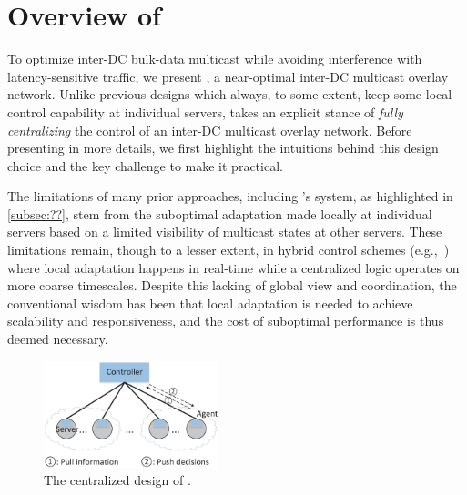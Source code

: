 \section{Overview of \name}
\label{sec:overview}

To optimize inter-DC bulk-data multicast while avoiding
interference with latency-sensitive traffic, we present \name,
a near-optimal inter-DC multicast overlay network.
Unlike previous designs which always, to some extent, keep
some local control capability at individual servers,
\name takes an explicit stance of {\em fully centralizing} the
control of an inter-DC multicast overlay network.
Before presenting \name in more details,
we first highlight the intuitions behind this design
choice and the key challenge to make it practical.







The limitations of many prior approaches, including \company's
system, as highlighted in \Section\ref{subsec:??},
stem from the suboptimal adaptation made locally
at individual servers
based on a limited visibility of multicast states at
other servers.
These limitations remain, though to a lesser extent, in hybrid
control schemes (e.g.,~\cite{vdn}) where local
adaptation happens in real-time while a centralized logic
operates on more coarse timescales.
Despite this lacking of global view and coordination, the
conventional wisdom has
been that local adaptation is needed to achieve
scalability and responsiveness, and the cost of suboptimal
performance is thus deemed necessary.

\begin{figure}[t]
  \centering
  \includegraphics[width=2in]{images/framework.eps}
  \caption{The centralized design of \name.}
  \label{fig:framework}
\vspace{-0.4cm}
\end{figure}

